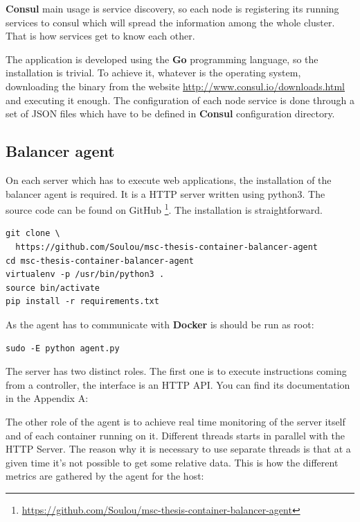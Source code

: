 \textbf{Consul} main usage is service discovery, so each node is registering its
running services to consul which will spread the information among the whole
cluster. That is how services get to know each other.

The application is developed using the \textbf{Go} programming language, so the
installation is trivial. To achieve it, whatever is the operating system,
downloading the binary from the website
\url{http://www.consul.io/downloads.html} and executing it enough.  The
configuration of each node service is done through a set of JSON files which
have to be defined in \textbf{Consul} configuration directory.

\subsection{Balancer agent}

On each server which has to execute web applications, the installation
of the balancer agent is required. It is a HTTP server written using python3.
The source code can be found on GitHub
\footnote{\url{https://github.com/Soulou/msc-thesis-container-balancer-agent}}. The
installation is straightforward.

\vspace{1em}
\begin{lstlisting}
git clone \
  https://github.com/Soulou/msc-thesis-container-balancer-agent
cd msc-thesis-container-balancer-agent
virtualenv -p /usr/bin/python3 .
source bin/activate
pip install -r requirements.txt
\end{lstlisting}

As the agent has to communicate with \textbf{Docker} is should be run as
root:

\vspace{1em}
\begin{lstlisting}
sudo -E python agent.py
\end{lstlisting}

The server has two distinct roles. The first one is to execute instructions
coming from a controller, the interface is an HTTP API. You can find its
documentation in the Appendix A: ~\nameref{app:agent-api}

The other role of the agent is to achieve real time monitoring of the
server itself and of each container running on it. Different threads
starts in parallel with the HTTP Server. The reason why it is necessary
to use separate threads is that at a given time it's not possible to
get some relative data. This is how the different metrics are gathered
by the agent for the host:

